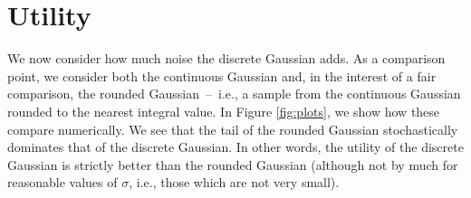 \documentclass{jpc}
\begin{document}
\section{Utility}
\label{sec:utility}

We now consider how much noise the discrete Gaussian adds. As a comparison point, we consider both the continuous Gaussian and, in the interest of a fair comparison, the rounded Gaussian~--~i.e., a sample from the continuous Gaussian rounded to the nearest integral value.
In Figure \ref{fig:plots}, we show how these compare numerically. We see that the tail of the rounded Gaussian stochastically dominates that of the discrete Gaussian. In other words, the utility of the discrete Gaussian is strictly better than the rounded Gaussian (although not by much for reasonable values of $\sigma$, i.e., those which are not very small).
\end{document}
